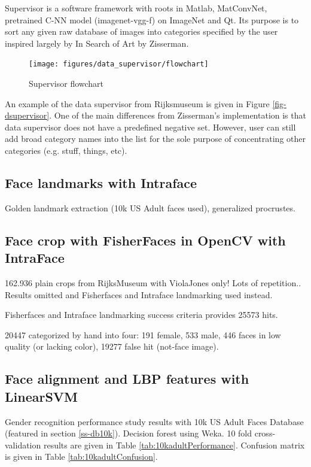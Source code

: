 \documentclass[runningheads]{llncs}
\newcommand{\fillertext}{\textcolor{black!20}{\lipsum[5-6]}}
\begin{document}
Supervisor is a software framework with roots in Matlab\cite{MATLAB:2014}, MatConvNet\cite{matconvnet}, pretrained C-NN model\cite{Chatfield14} (imagenet-vgg-f) on ImageNet\cite{ILSVRC15} and Qt. Its purpose is to sort any given raw database of images into categories specified by the user inspired largely by In Search of Art by Zisserman\cite{Crowley14a}.

\begin{figure}
	\texttt{[image: figures/data\_supervisor/flowchart]}
	\caption{Supervisor flowchart}
	\label{fig:supervisorflow}
\end{figure}

An example of the data supervisor from Rijksmuseum\cite{rijksmuseum1976tot} is given in Figure \ref{fig-dsupervisor}. One of the main differences from Zisserman's\cite{Crowley14a} implementation is that data supervisor does not have a predefined negative set. However, user can still add broad category names into the list for the sole purpose of concentrating other categories (e.g. stuff, things, etc).

\subsection{Face landmarks with Intraface}
Golden landmark extraction (10k US Adult faces used), generalized procrustes.

\fillertext

\subsection{Face crop with FisherFaces in OpenCV with IntraFace}
162.936 plain crops from RijksMuseum\cite{rijksmuseum1976tot} with ViolaJones only! Lots of repetition.. Results omitted and Fisherfaces and Intraface landmarking used instead.

Fisherfaces and Intraface landmarking success criteria provides 25573 hits. 

20447 categorized by hand into four: 191 female, 533 male, 446 faces in low quality (or lacking color), 19277 false hit (not-face image).

\subsection{Face alignment and LBP features with LinearSVM}
Gender recognition performance study results with 10k US Adult Faces Database (featured in section \ref{ss-db10k}). Decision forest using Weka\cite{hall2009weka}. 10 fold cross-validation results are given in Table \ref{tab:10kadultPerformance}. Confusion matrix is given in Table \ref{tab:10kadultConfusion}.
\end{document}
